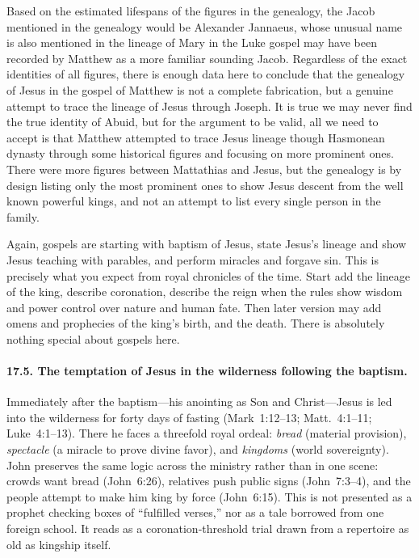 Based on the estimated lifespans of the figures in the genealogy, the Jacob mentioned in the genealogy would be Alexander Jannaeus, whose unusual name is also mentioned in the lineage of Mary in the Luke gospel may have been recorded by Matthew as a more familiar sounding Jacob.
Regardless of the exact identities of all figures, there is enough data here to conclude that the genealogy of Jesus in the gospel of Matthew is not a complete fabrication, but a genuine attempt to trace the lineage of Jesus through Joseph.
It is true we may never find the true identity of Abuid, but for the argument to be valid, all we need to accept is that Matthew attempted to trace Jesus lineage though Hasmonean dynasty through some historical figures and focusing on more prominent ones.
There were more figures between Mattathias and Jesus, but the genealogy is by design listing only the most prominent ones to show Jesus descent from the well known powerful kings, and not an attempt to list every single person in the family.

Again, gospels are starting with baptism of Jesus, state Jesus's lineage and show Jesus teaching with parables, and perform miracles and forgave sin.
This is precisely what you expect from royal chronicles of the time.
Start add the lineage of the king, describe coronation, describe the reign when the rules show wisdom and power control over nature and human fate.
Then later version may add omens and prophecies of the king's birth, and the death.
There is absolutely nothing special about gospels here.
\paragraph{17.5.
The temptation of Jesus in the wilderness following the baptism.}\label{par:the-temptation-of-jesus-in-the-wilderness-following-the-baptism.}

Immediately after the baptism---his anointing as Son and Christ---Jesus is led into the wilderness for forty days of fasting (Mark~1:12--13; Matt.~4:1--11; Luke~4:1--13).
There he faces a threefold royal ordeal: \emph{bread} (material provision), \emph{spectacle} (a miracle to prove divine favor), and \emph{kingdoms} (world sovereignty).
John preserves the same logic across the ministry rather than in one scene: crowds want bread (John~6:26), relatives push public signs (John~7:3--4), and the people attempt to make him king by force (John~6:15).
This is not presented as a prophet checking boxes of “fulfilled verses,” nor as a tale borrowed from one foreign school.
It reads as a coronation‐threshold trial drawn from a repertoire as old as kingship itself.


